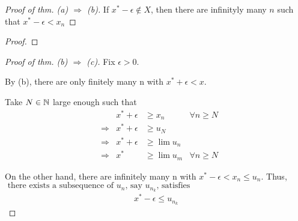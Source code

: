 \documentclass[a4paper,12pt]{article}
\begin{document}
\begin{theorem}
\begin{proof}[Proof of thm. (a) \(\Rightarrow\) (b)]
            If \(x^*-\epsilon \notin X\), then there are infinityly many \(n\) such that \(x^* - \epsilon<x_n\)
        \end{proof}

        \begin{proof}
            
        \end{proof}

        \begin{proof}[Proof of thm. (b) \(\Rightarrow\) (c)]
            Fix \(\epsilon>0\).

            By (b), there are only finitely many n with \(x^*+\epsilon<x\).

            Take \(N\in\mathbb{N}\) large enough such that
            \begin{align*}
                &&x^*+\epsilon&\ge x_n&\forall n\ge N\\
                &\Rightarrow&x^*+\epsilon &\ge u_N\\
                &\Rightarrow&x^*+\epsilon &\ge \lim{u_n}\\
                &\Rightarrow&x^* &\ge \lim{u_m} &\forall n\ge N
            \end{align*}

            On the other hand, there are infinitely many n with \(x^*-\epsilon<x_n\le u_n\). Thus,
            \(\text{ there exists a subsequence of }u_n\text{, say }u_{n_k}\text{, satisfies}\)
            \begin{align*}
                x^*-\epsilon\le u_{n_k}
            \end{align*}
        \end{proof}
    \end{theorem}
\end{document}
